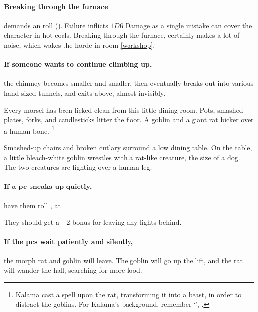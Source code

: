 \begin{multicols}{2}
\paragraph{Breaking through the furnace}
demands an  roll (\tn[6]).
Failure inflicts $1D6$ Damage as a single mistake can cover the character in hot coals.
Breaking through the furnace, certainly makes a lot of noise, which wakes the horde in room \ref{workshop}.

\paragraph{If someone wants to continue climbing up,}
the chimney becomes smaller and smaller, then eventually breaks out into various hand-sized tunnels, and exits above, almost invisibly.


Every morsel has been licked clean from this little dining room.
Pots, smashed plates, forks, and candlesticks litter the floor.
A goblin and a giant rat bicker over a human bone.%
\footnote{%
  Kalama cast a spell upon the rat, transforming it into a beast, in order to distract the goblins.
  For Kalama's background, remember `', .
}

\begin{boxtext}

  Smashed-up chairs and broken cutlary surround a low dining table.
  On the table, a little bleach-white goblin wrestles with a rat-like creature, the size of a dog.
  The two creatures are fighting over a human leg.

\end{boxtext}

\paragraph{If a \gls{pc} sneaks up quietly,}
have them roll ,  at \tn[9].

They should get a +2 bonus for leaving any lights behind.

\paragraph{If the \glspl{pc} wait patiently and silently,}
the morph rat and goblin will leave.
The goblin will go up the lift, and the rat will wander the hall, searching for more food.


\end{multicols}
